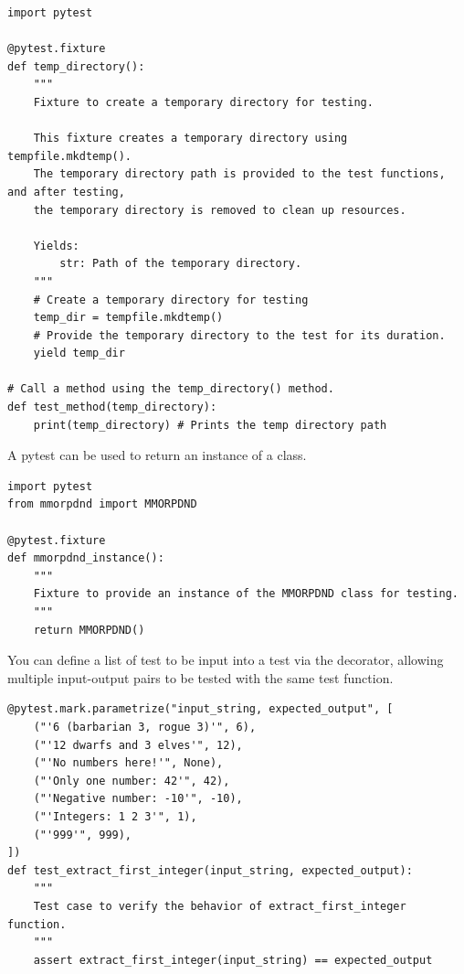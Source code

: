 \begin{lstlisting}
import pytest

@pytest.fixture
def temp_directory():
    """
    Fixture to create a temporary directory for testing.

    This fixture creates a temporary directory using tempfile.mkdtemp().
    The temporary directory path is provided to the test functions, and after testing,
    the temporary directory is removed to clean up resources.

    Yields:
        str: Path of the temporary directory.
    """
    # Create a temporary directory for testing
    temp_dir = tempfile.mkdtemp()
    # Provide the temporary directory to the test for its duration.
    yield temp_dir

# Call a method using the temp_directory() method.
def test_method(temp_directory):
	print(temp_directory) # Prints the temp directory path
\end{lstlisting}

A pytest  can be used to return an instance of a class.

\begin{lstlisting}
import pytest
from mmorpdnd import MMORPDND

@pytest.fixture
def mmorpdnd_instance():
    """
    Fixture to provide an instance of the MMORPDND class for testing.
    """
    return MMORPDND()
\end{lstlisting}

You can define a list of test  to be input into a test via the  decorator, allowing multiple input-output pairs to be tested with the same test function.

\begin{lstlisting}
@pytest.mark.parametrize("input_string, expected_output", [
    ("'6 (barbarian 3, rogue 3)'", 6),
    ("'12 dwarfs and 3 elves'", 12),
    ("'No numbers here!'", None),
    ("'Only one number: 42'", 42),
    ("'Negative number: -10'", -10),
    ("'Integers: 1 2 3'", 1),
    ("'999'", 999),
])
def test_extract_first_integer(input_string, expected_output):
    """
    Test case to verify the behavior of extract_first_integer function.
    """
    assert extract_first_integer(input_string) == expected_output
\end{lstlisting}









